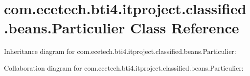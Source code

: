 \hypertarget{classcom_1_1ecetech_1_1bti4_1_1itproject_1_1classified_1_1beans_1_1_particulier}{}\section{com.\+ecetech.\+bti4.\+itproject.\+classified.\+beans.\+Particulier Class Reference}
\label{classcom_1_1ecetech_1_1bti4_1_1itproject_1_1classified_1_1beans_1_1_particulier}


Inheritance diagram for com.\+ecetech.\+bti4.\+itproject.\+classified.\+beans.\+Particulier\+:


Collaboration diagram for com.\+ecetech.\+bti4.\+itproject.\+classified.\+beans.\+Particulier\+:
